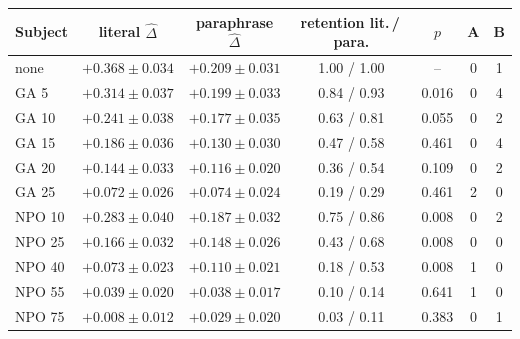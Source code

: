 \begin{tabular}{lcccccc}
\toprule
Subject & literal $\hat\Delta$ & paraphrase $\hat\Delta$ & retention lit.\,/\,para. & $p$ & A & B \\
\midrule
none & $+0.368\pm0.034$ & $+0.209\pm0.031$ & 1.00 / 1.00 & -- & 0 & 1 \\
GA 5 & $+0.314\pm0.037$ & $+0.199\pm0.033$ & 0.84 / 0.93 & 0.016 & 0 & 4 \\
GA 10 & $+0.241\pm0.038$ & $+0.177\pm0.035$ & 0.63 / 0.81 & 0.055 & 0 & 2 \\
GA 15 & $+0.186\pm0.036$ & $+0.130\pm0.030$ & 0.47 / 0.58 & 0.461 & 0 & 4 \\
GA 20 & $+0.144\pm0.033$ & $+0.116\pm0.020$ & 0.36 / 0.54 & 0.109 & 0 & 2 \\
GA 25 & $+0.072\pm0.026$ & $+0.074\pm0.024$ & 0.19 / 0.29 & 0.461 & 2 & 0 \\
NPO 10 & $+0.283\pm0.040$ & $+0.187\pm0.032$ & 0.75 / 0.86 & 0.008 & 0 & 2 \\
NPO 25 & $+0.166\pm0.032$ & $+0.148\pm0.026$ & 0.43 / 0.68 & 0.008 & 0 & 0 \\
NPO 40 & $+0.073\pm0.023$ & $+0.110\pm0.021$ & 0.18 / 0.53 & 0.008 & 1 & 0 \\
NPO 55 & $+0.039\pm0.020$ & $+0.038\pm0.017$ & 0.10 / 0.14 & 0.641 & 1 & 0 \\
NPO 75 & $+0.008\pm0.012$ & $+0.029\pm0.020$ & 0.03 / 0.11 & 0.383 & 0 & 1 \\
\bottomrule
\end{tabular}

